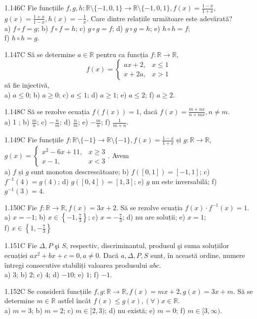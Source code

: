 \documentclass[11pt]{article}
\begin{document}
1.146C Fie funcțiile $f, g, h: \mathbb{R} \setminus\{-1,0,1\} \rightarrow \mathbb{R} \setminus\{-1,0,1\}, f(x)=\frac{1-x}{1+x}$, $g(x)=\frac{1+x}{1-x}, h(x)=-\frac{1}{x}$. Care dintre relațiile următoare este adevărată?\\ a) $f \circ f=g$; b) $f \circ f=h$; c) $g \circ g=f$; d) $g \circ g=h$; e) $h \circ h=f$;\\ f) $h \circ h=g$.

1.147C Să se determine $a \in \mathbb{R}$ pentru ca funcția $f: \mathbb{R} \rightarrow \mathbb{R}$, $$f(x)= \begin{cases}a x+2, & x \leq 1 \\ x+2 a, & x>1\end{cases}$$ să fie injectivă,\\ a) $a \leq 0$; b) $a \geq 0$; c) $a \leq 1$; d) $a \geq 1$; e) $a \leq 2$; f) $a \geq 2$.

1.148C Să se rezolve ecuația $f(f(x))=1$, dacă $f(x)=\frac{m+n x}{n+m x}, n \neq m$.\\ a) 1 ; b) $\frac{m}{n}$; c) $-\frac{n}{m}$; d) $\frac{n}{m}$; e) $-\frac{m}{n}$; f) $\frac{1}{m+n}$.

1.149C Fie funcțiile $f: \mathbb{R} \setminus\{-1\} \rightarrow \mathbb{R} \setminus\{-1\}, f(x)=\frac{1-x}{1+x}$ și $g: \mathbb{R} \rightarrow \mathbb{R}$, $g(x)=\left\{\begin{array}{ll}x^{2}-6 x+11, & x \geq 3 \\ x-1, & x<3\end{array}\right.$. Avem\\ a) $f$ și $g$ sunt monoton descrescătoare; b) $f([0,1])=[-1,1]$; c) $f^{-1}(4)=g(4)$; d) $g([0,4])=[1,3]$; e) $g$ nu este inversabilă; f) $g^{-1}(3)=4$.

1.150C Fie $f: \mathbb{R} \rightarrow \mathbb{R}, f(x)=3 x+2$. Să se rezolve ecuația $f(x) \cdot f^{-1}(x)=1$.\\ a) $x=-1$; b) $x \in\left\{-1, \frac{7}{3}\right\}$; c) $x=-\frac{7}{3}$; d) nu are soluții; e) $x=1$;\\ f) $x \in\left\{1,-\frac{7}{3}\right\}$

1.151C Fie $\Delta, P$ şi $S$, respectiv, discriminantul, produsul şi suma soluțiilor ecuației $a x^{2}+b x+c=0, a \neq 0$. Dacă $a, \Delta, P, S$ sunt, în această ordine, numere întregi consecutive stabiliți valoarea produsului $a b c$.\\ a) $3$; b) $2$; c) $4$; d) $-10$; e) $1$; f) $-1$.

1.152C Se consideră funcțiile $f, g: \mathbb{R} \rightarrow \mathbb{R}, f(x)=m x+2, g(x)=3 x+m$. Să se determine $m \in \mathbb{R}$ astfel încât $f(x) \leq g(x),(\forall) x \in \mathbb{R}$.\\ a) $m=3$; b) $m=2$; c) $m \in[2,3)$; d) nu există; e) $m=0$; f) $m \in[3, \infty)$.
\end{document}
